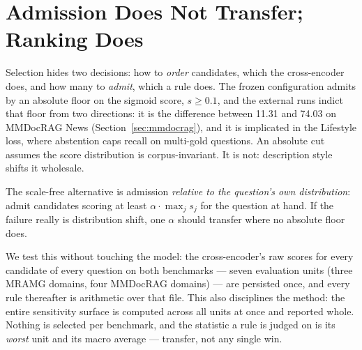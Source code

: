 \documentclass[journal]{IEEEtran}
\begin{document}
\section{Admission Does Not Transfer; Ranking Does}
\label{sec:admission}

Selection hides two decisions: how to \emph{order} candidates, which the
cross-encoder does, and how many to \emph{admit}, which a rule does. The frozen
configuration admits by an absolute floor on the sigmoid score, $s \geq 0.1$,
and the external runs indict that floor from two directions: it is the
difference between 11.31 and 74.03 on MMDocRAG News
(Section~\ref{sec:mmdocrag}), and it is implicated in the Lifestyle loss, where
abstention caps recall on multi-gold questions. An absolute cut assumes the
score distribution is corpus-invariant. It is not: description style shifts it
wholesale.

The scale-free alternative is admission \emph{relative to the question's own
distribution}: admit candidates scoring at least $\alpha \cdot
\max_j s_j$ for the question at hand. If the failure really is distribution
shift, one $\alpha$ should transfer where no absolute floor does.

We test this without touching the model: the cross-encoder's raw scores for
every candidate of every question on both benchmarks --- seven evaluation units
(three MRAMG domains, four MMDocRAG domains) --- are persisted once, and every
rule thereafter is arithmetic over that file. This also disciplines the method:
the entire sensitivity surface is computed across all units at once and
reported whole. Nothing is selected per benchmark, and the statistic a rule is
judged on is its \emph{worst} unit and its macro average --- transfer, not any
single win.
\end{document}
